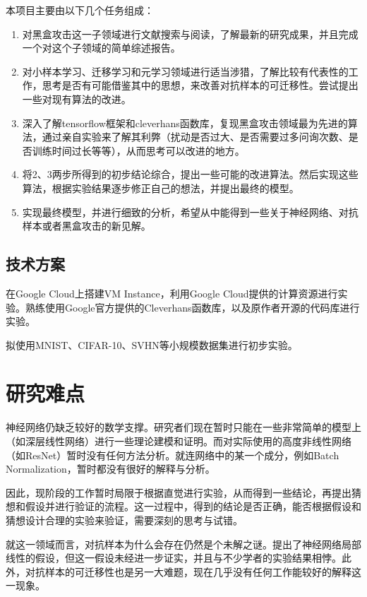 本项目主要由以下几个任务组成：
\begin{enumerate}
\item 对黑盒攻击这一子领域进行文献搜索与阅读，了解最新的研究成果，并且完成一个对这个子领域的简单综述报告。
\item 对小样本学习、迁移学习和元学习领域进行适当涉猎，了解比较有代表性的工作，思考是否有可能借鉴其中的思想，来改善对抗样本的可迁移性。尝试提出一些对现有算法的改进。
\item 深入了解tensorflow框架和cleverhans函数库，复现黑盒攻击领域最为先进的算法，通过亲自实验来了解其利弊（扰动是否过大、是否需要过多问询次数、是否训练时间过长等等），从而思考可以改进的地方。
\item 将2、3两步所得到的初步结论综合，提出一些可能的改进算法。然后实现这些算法，根据实验结果逐步修正自己的想法，并提出最终的模型。
\item 实现最终模型，并进行细致的分析，希望从中能得到一些关于神经网络、对抗样本或者黑盒攻击的新见解。
\end{enumerate}

\section{技术方案}

在Google Cloud上搭建VM Instance，利用Google Cloud提供的计算资源进行实验。熟练使用Google官方提供的Cleverhans函数库，以及原作者开源的代码库进行实验。

拟使用MNIST\cite{lecun1998mnist}、CIFAR-10\cite{cifar10}、SVHN\cite{netzer2011reading}等小规模数据集进行初步实验。

\vspace{\baselineskip}
{\let\clearpage\relax \chapter{研究难点}}

神经网络仍缺乏较好的数学支撑。研究者们现在暂时只能在一些非常简单的模型上（如深层线性网络）进行一些理论建模和证明。而对实际使用的高度非线性网络（如ResNet）暂时没有任何方法分析。就连网络中的某一个成分，例如Batch Normalization，暂时都没有很好的解释与分析。

因此，现阶段的工作暂时局限于根据直觉进行实验，从而得到一些结论，再提出猜想和假设并进行验证的流程。这一过程中，得到的结论是否正确，能否根据假设和猜想设计合理的实验来验证，需要深刻的思考与试错。

就这一领域而言，对抗样本为什么会存在仍然是个未解之谜。\citet{goodfellow2015explaining}提出了神经网络局部线性的假设，但这一假设未经进一步证实，并且与不少学者的实验结果相悖。此外，对抗样本的可迁移性也是另一大难题，现在几乎没有任何工作能较好的解释这一现象。

